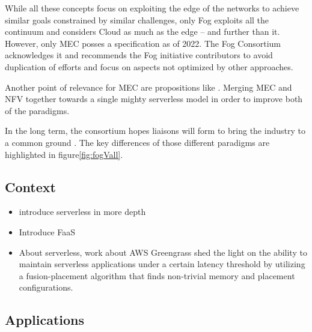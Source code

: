 \documentclass[11pt]{sdm}
\begin{document}
While all these concepts focus on exploiting the edge of the networks to achieve similar goals constrained by similar challenges, only Fog exploits all the continuum and considers Cloud as much as the edge -- and further than it. However, only \gls{MEC} posses a specification as of 2022. The Fog Consortium acknowledges it and recommends the Fog initiative contributors to avoid duplication of efforts and focus on aspects not optimized by other approaches. 

Another point of relevance for \gls{MEC} are propositions like . Merging \gls{MEC} and \gls{NFV} together towards a single mighty serverless model in order to improve both of the paradigms.

In the long term, the consortium hopes liaisons will form to bring the industry to a common ground \cite{ieee_standards_association_ieee_2018}. The key differences of those different paradigms are highlighted in figure\ref{fig:fogVall}.

\subsection {Context}
\begin{itemize}
	\item introduce serverless in more depth
	\item Introduce \gls{FaaS}
	\item About serverless,  work about AWS Greengrass shed the light on the ability to maintain serverless applications under a certain latency threshold by utilizing a fusion-placement algorithm that finds non-trivial memory and placement configurations.
\end{itemize}

\subsection {Applications}
\end{document}
